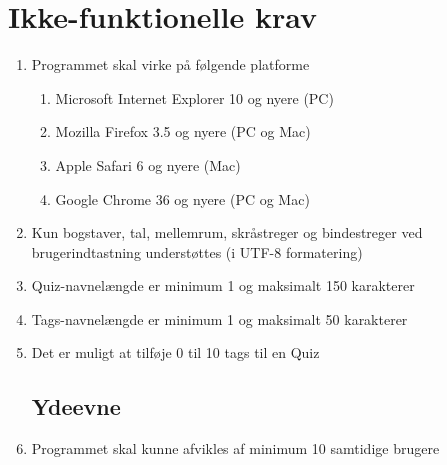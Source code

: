\section{Ikke-funktionelle krav}
\begin{enumerate}
	\subsection*{Brugbarhed}
	\item Programmet skal virke på følgende platforme
	\begin{enumerate}
		\item Microsoft Internet Explorer 10 og nyere (PC)
		\item Mozilla Firefox 3.5 og nyere (PC og Mac)
		\item Apple Safari 6 og nyere (Mac)
		\item Google Chrome 36 og nyere (PC og Mac)
	\end{enumerate}
	
	\item Kun bogstaver, tal, mellemrum, skråstreger og bindestreger ved brugerindtastning understøttes (i UTF-8 formatering)
	\item Quiz-navnelængde er minimum 1 og maksimalt 150 karakterer
	\item Tags-navnelængde er minimum 1 og maksimalt 50 karakterer 
	\item Det er muligt at tilføje 0 til 10 tags til en Quiz
	\subsection*{Ydeevne}
	\item Programmet skal kunne afvikles af minimum 10 samtidige brugere
\end{enumerate}